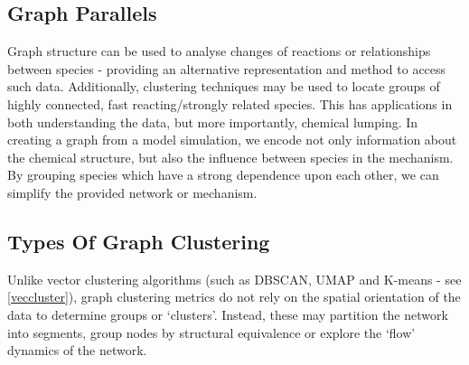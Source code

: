 \subsection{Graph Parallels}


Graph structure can be used to analyse changes of reactions or relationships between species - providing an alternative representation and method to access such data. Additionally, clustering techniques may be used to locate groups of highly connected, fast reacting/strongly related species. This has applications in both understanding the data, but more importantly, chemical lumping. In creating a graph from a model simulation, we encode not only information about the chemical structure, but also the influence between species in the mechanism. By grouping species which have a strong dependence upon each other, we can simplify the provided network or mechanism.

 \subsection{Types Of Graph Clustering}
Unlike vector clustering algorithms (such as DBSCAN, UMAP and K-means - see \autoref{veccluster}), graph clustering metrics do not rely on the spatial orientation of the data to determine groups or `clusters'. Instead, these may partition the network into segments, group nodes by structural equivalence or explore the `flow' dynamics of the network.

